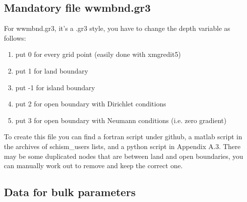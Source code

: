 \documentclass[preprints,briefreport,accept,oneauthor,pdftex]{Definitions/mdpi}
\begin{document}
\subsection{Mandatory file wwmbnd.gr3}
\noindent For wwmbnd.gr3, it's a .gr3 style, you have to change the depth variable as follows:
\begin{enumerate}
    \item put 0 for every grid point (easily done with xmgredit5)
    \item put 1 for land boundary
    \item put -1 for island boundary
    \item put 2 for open boundary with Dirichlet conditions
    \item put 3 for open boundary with Neumann conditions (i.e. zero gradient)
\end{enumerate}
To create this file you can find a fortran script under github, a matlab script in the archives of schism\_users lists, and a python script in Appendix A.3.
There may be some duplicated nodes that are between land and open boundaries, you can manually work out to remove and keep the correct one.\\
\subsection{Data for bulk parameters}
\end{document}
